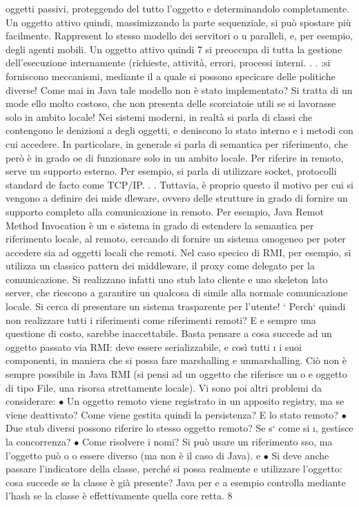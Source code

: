 oggetti passivi, proteggendo del tutto l'oggetto e determinandolo completamente. Un oggetto attivo quindi, massimizzando
la parte sequenziale,
si può spostare più facilmente. Rappresent lo stesso modello dei servitori
o
u
paralleli, e, per esempio, degli agenti mobili. Un oggetto attivo quindi
7
si preoccupa di tutta la gestione dell'esecuzione internamente (richieste,
attività, errori, processi interni. . . :si forniscono meccanismi, mediante il
a
quale si possono specicare delle politiche diverse!
Come mai in Java tale modello non è stato implementato? Si tratta di un mode
ello molto costoso, che non presenta delle scorciatoie utili se si lavorasse solo in
ambito locale!
Nei sistemi moderni, in realtà si parla di classi che contengono le denizioni
a
degli oggetti, e deniscono lo stato interno e i metodi con cui accedere. In particolare, in generale si parla di
semantica per riferimento, che però è in grado
oe
di funzionare solo in un ambito locale. Per riferire in remoto, serve un supporto
esterno. Per esempio, si parla di utilizzare socket, protocolli standard de facto
come TCP/IP. . .
Tuttavia, è proprio questo il motivo per cui si vengono a definire dei mide
dleware, ovvero delle strutture in grado di fornire un supporto completo alla
comunicazione in remoto. Per esempio, Java Remot Method Invocation è un
e
sistema in grado di estendere la semantica per riferimento locale, al remoto,
cercando di fornire un sistema omogeneo per poter accedere sia ad oggetti locali
che remoti. Nel caso specico di RMI, per esempio, si utilizza un classico pattern dei middleware, il proxy come delegato
per la comunicazione. Si realizzano
infatti uno stub lato cliente e uno skeleton lato server, che riescono a garantire
un qualcosa di simile alla normale comunicazione locale. Si cerca di presentare
un sistema trasparente per l'utente!
`
Perch` quindi non realizzare tutti i riferimenti come riferimenti remoti? E
e
sempre una questione di costo, sarebbe inaccettabile. Basta pensare a cosa
succede ad un oggetto passato via RMI: deve essere serializzabile, e così tutti
\i{}
i suoi componenti, in maniera che si possa fare marshalling e unmarshalling.
Ciò non è sempre possibile in Java RMI (si pensi ad un oggetto che riferisce un
o
e
oggetto di tipo File, una risorsa strettamente locale). Vi sono poi altri problemi
da considerare:
$\bullet$ Un oggetto remoto viene registrato in un apposito registry, ma se viene
deattivato? Come viene gestita quindi la persistenza? E lo stato remoto?
$\bullet$ Due stub diversi possono riferire lo stesso oggetto remoto? Se s` come si
\i{},
gestisce la concorrenza?
$\bullet$ Come risolvere i nomi? Si può usare un riferimento sso, ma l'oggetto può
o
o
essere diverso (ma non è il caso di Java).
e
$\bullet$ Si deve anche passare l'indicatore della classe, perché si possa realmente
e
utilizzare l'oggetto: cosa succede se la classe è già presente? Java per
e a
esempio controlla mediante l'hash se la classe è effettivamente quella core
retta.
8
